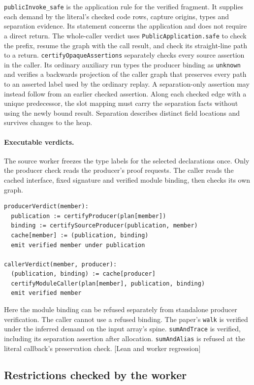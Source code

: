 \documentclass[10pt,a4paper]{article}
\theoremstyle{definition}
\newcommand{\code}[1]{\textcolor{codec}{\texttt{#1}}}
\newcommand{\lean}[1]{\textcolor{leanc}{\texttt{\small #1}}}
\newcommand{\status}[1]{\textcolor{leanc}{\textsf{\small[#1]}}}
\begin{document}
\lean{publicInvoke\_safe} is the application rule for the verified
fragment. It supplies each demand by the literal's checked code rows,
capture origins, types and separation evidence. Its statement concerns
the application and does not require a direct return. The whole-caller
verdict uses \lean{PublicApplication.safe} to check the prefix, resume
the graph with the call result, and check its straight-line path to a
return. \lean{certifyOpaqueAssertions} separately checks every source
assertion in the caller. Its ordinary auxiliary run types the producer
binding as \code{unknown} and verifies a backwards projection of the
caller graph that preserves every path to an asserted label used by the
ordinary replay. A separation-only assertion may instead follow from an
earlier checked assertion. Along each checked edge with a unique
predecessor, the slot mapping must carry the separation facts without
using the newly bound result. Separation describes distinct field
locations and survives changes to the heap.

\paragraph{Executable verdicts.}
The source worker freezes the type labels for the selected declarations
once. Only the producer check reads the producer's proof requests. The
caller reads the cached interface, fixed signature and verified module
binding, then checks its own graph.

\begin{lstlisting}
producerVerdict(member):
  publication := certifyProducer(plan[member])
  binding := certifySourceProducer(publication, member)
  cache[member] := (publication, binding)
  emit verified member under publication

callerVerdict(member, producer):
  (publication, binding) := cache[producer]
  certifyModuleCaller(plan[member], publication, binding)
  emit verified member
\end{lstlisting}

Here the module binding can be refused separately from standalone
producer verification. The caller cannot use a refused binding. The
paper's \code{walk} is verified under the inferred demand on the input
array's spine. \code{sumAndTrace} is verified, including its separation
assertion after allocation. \code{sumAndAlias} is refused at the literal
callback's preservation check.
\status{Lean and worker regression}

\subsection{Restrictions checked by the worker}
\end{document}

